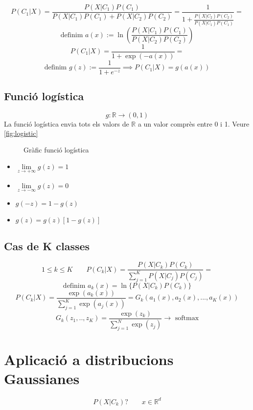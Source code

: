 $$
P(C_1|X) = \frac{P(X|C_1)P(C_1)}{P(X|C_1)P(C_1) + P(X|C_2)P(C_2)} = 
\frac{1}{1 + \frac{P(X|C_2)P(C_2)}{P(X|C_1)P(C_1)}} =
$$
$$
\text{definim } a(x) := \ln \left( \frac{P(X|C_1)P(C_1)}{P(X|C_2)P(C_2)} \right)
$$
$$
P(C_1|X) = \frac{1}{1 + \exp(-a(x))} = 
$$
$$
\text{definim } g(z) := \frac{1}{1 + e^{-z}} \implies P(C_1|X) = g(a(x))
$$


\subsection{Funció logística}

$$
g:\mathbb{R} \rightarrow (0,1)
$$
La funció logística envia tots els valors de $\mathbb{R}$ a un valor comprès entre 0 i 1. Veure \autoref{fig:logistic}

\begin{figure}[H]
	\centering
	\caption{Gràfic funció logística}
	\label{fig:logistic}
\end{figure}

\begin{itemize}
	\item $ \lim\limits_{z \to +\infty} g(z) = 1 $
	\item $ \lim\limits_{z \to -\infty} g(z) = 0 $
	\item $ g(-z) = 1 - g(z) $
	\item $ g(z) = g(z)[1 - g(z)] $
\end{itemize}

\subsection{Cas de K classes}
$$
1 \le k \le K \qquad P(C_k | X) = \frac{P(X|C_k)P(C_k)}{\sum_{j=1}^K P(X|C_j)P(C_j)} =
$$
$$
\text{definim } a_k(x) = \ln\{P(X|C_k)P(C_k)\}
$$
$$
P(C_k|X) = \frac{\exp(a_k(x))}{\sum_{j=1}^K \exp(a_j(x))} = G_k (a_1(x), a_2(x),...,a_K(x))
$$
$$
G_k(z_1,..,z_K) = \frac{\exp(z_k)}{\sum_{j=1}^N \exp(z_j)} \longrightarrow \text{ softmax}
$$

\section{Aplicació a distribucions Gaussianes}
$$
P(X|C_k) ? \qquad x \in \mathbb{R}^d
$$


